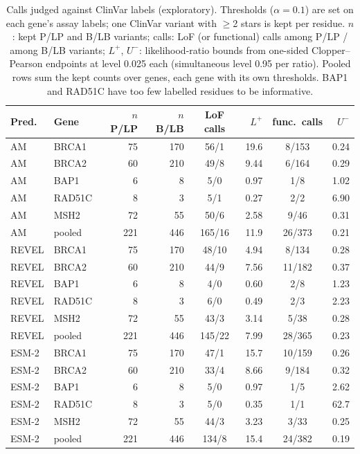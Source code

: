 \begin{table}[ht]
\centering
\caption{Calls judged against ClinVar labels (exploratory). Thresholds ($\alpha=0.1$) are set on each gene's assay
labels; one ClinVar variant with $\ge$2 stars is kept per residue. $n$: kept P/LP and B/LB variants; calls: LoF (or
functional) calls among P/LP / among B/LB variants; $L^+$, $U^-$: likelihood-ratio bounds from one-sided
Clopper--Pearson endpoints at level 0.025 each (simultaneous level 0.95 per ratio). Pooled rows sum the kept counts over
genes, each gene with its own thresholds. BAP1 and RAD51C have too few labelled residues to be informative.}
\label{tab:app_clinvar}
\setlength{\tabcolsep}{4.5pt}
\begin{tabular}{llrrcrcr}
\toprule
Pred. & Gene & $n$ P/LP & $n$ B/LB & LoF calls & $L^+$ & func.\ calls & $U^-$\\
\midrule
AM & BRCA1 & 75 & 170 & 56/1 & 19.6 & 8/153 & 0.24 \\
AM & BRCA2 & 60 & 210 & 49/8 & 9.44 & 6/164 & 0.29 \\
AM & BAP1 & 6 & 8 & 5/0 & 0.97 & 1/8 & 1.02 \\
AM & RAD51C & 8 & 3 & 5/1 & 0.27 & 2/2 & 6.90 \\
AM & MSH2 & 72 & 55 & 50/6 & 2.58 & 9/46 & 0.31 \\
AM & pooled & 221 & 446 & 165/16 & 11.9 & 26/373 & 0.21 \\
REVEL & BRCA1 & 75 & 170 & 48/10 & 4.94 & 8/134 & 0.28 \\
REVEL & BRCA2 & 60 & 210 & 44/9 & 7.56 & 11/182 & 0.37 \\
REVEL & BAP1 & 6 & 8 & 4/0 & 0.60 & 2/8 & 1.23 \\
REVEL & RAD51C & 8 & 3 & 6/0 & 0.49 & 2/3 & 2.23 \\
REVEL & MSH2 & 72 & 55 & 43/3 & 3.14 & 5/38 & 0.28 \\
REVEL & pooled & 221 & 446 & 145/22 & 7.99 & 28/365 & 0.23 \\
ESM-2 & BRCA1 & 75 & 170 & 47/1 & 15.7 & 10/159 & 0.26 \\
ESM-2 & BRCA2 & 60 & 210 & 33/4 & 8.66 & 9/184 & 0.32 \\
ESM-2 & BAP1 & 6 & 8 & 5/0 & 0.97 & 1/5 & 2.62 \\
ESM-2 & RAD51C & 8 & 3 & 5/0 & 0.35 & 1/1 & 62.7 \\
ESM-2 & MSH2 & 72 & 55 & 44/3 & 3.23 & 3/33 & 0.25 \\
ESM-2 & pooled & 221 & 446 & 134/8 & 15.4 & 24/382 & 0.19 \\
\bottomrule
\end{tabular}
\end{table}
